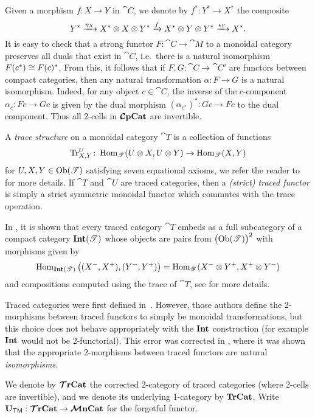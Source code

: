 \documentclass[11pt,oneside,article]{memoir}
\begin{document}
Given a morphism $f\colon X\to Y$ in $\cat{C}$, we denote by $f^*\colon Y^*\to X^*$ the composite
\begin{equation*}
   Y^*\xrightarrow{\eta_X}X^*\otimes X\otimes Y^* \xrightarrow{f}X^*\otimes Y\otimes Y^*\xrightarrow{\epsilon_Y}X^*.
\end{equation*}
It is easy to check that a strong functor $F\colon\cat{C}\to\cat{M}$ to a monoidal category preserves all duals that exist
in $\cat{C}$, i.e.\ there is a natural isomorphism $F(c^*)\cong F(c)^*$.  From this, it follows that if $F,G\colon\cat{C}\to\cat{C'}$ are functors between compact categories, then any natural
transformation $\alpha\colon F\to G$ is a natural isomorphism. Indeed, for any object $c\in\cat{C}$,
the inverse of the $c$-component $\alpha_c\colon Fc\to Gc$ is given by the dual morphism
$(\alpha_{c^*})^*\colon Gc\to Fc$ to the dual component.  Thus all 2-cells in $\bm{\mathcal{C}}\mathbf{pCat}$ are invertible.

A \emph{trace structure} on a monoidal category $\cat{T}$ is a collection of functions
\begin{equation}
      \label{dia:trace function}
   \operatorname{Tr}^U_{X,Y}\colon\operatorname{Hom}_{\mathscr{T}}(U\otimes X,U\otimes Y)\to\operatorname{Hom}_{\mathscr{T}}(X,Y)
\end{equation}
for $U,X,Y\in\mathrm{Ob}(\mathscr{T})$ satisfying seven equational axioms, we refer the reader to \cite{JoyalStreetVerity} for more details.  If $\cat{T}$ and $\cat{U}$ are traced categories, then a \emph{(strict) traced functor} is simply a strict symmetric monoidal functor which commutes with the trace operation.

In \cite{JoyalStreetVerity}, it is shown that every traced category $\cat{T}$ embeds as a full subcategory of a compact category $\mathbf{Int}(\mathscr{T})$ whose objects are pairs from $\big(\mathrm{Ob}(\mathscr{T})\big)^2$ with morphisms given by
\begin{equation*}
   \operatorname{Hom}_{\mathbf{Int}(\mathscr{T})}\big((X^-,X^+),(Y^-,Y^+)\big)
      = \operatorname{Hom}_{\mathscr{Y}}(X^-\otimes Y^+,X^+\otimes Y^-)
\end{equation*}
and compositions computed using the trace of $\cat{T}$, see \cite{JoyalStreetVerity} for more details.
\begin{remark}
      \label{rem:traced_2morphisms}
   Traced categories were first defined in~\cite{JoyalStreetVerity}. However, those authors define
   the 2-morphisms between traced functors to simply be monoidal transformations, but this choice does
   not behave appropriately with the $\mathbf{Int}$ construction (for example $\mathbf{Int}$ would not be
   2-functorial). This error was corrected in \cite{HK}, where it was shown that the appropriate
   2-morphisms between traced functors are natural \emph{isomorphisms}. 
\end{remark}
We denote by $\bm{\mathcal{T}}\mathbf{rCat}$ the corrected 2-category of traced categories (where 2-cells are invertible), and we denote its underlying 1-category by $\mathbf{TrCat}$.  Write $\mathbf{U}_{\mathsf{TM}}:\bm{\mathcal{T}}\mathbf{rCat}\to\bm{\mathcal{M}}\mathbf{nCat}$ for the forgetful functor.
\end{document}
